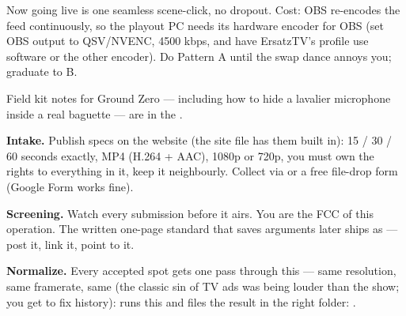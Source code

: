 \documentclass[fontpath=fonts/,logopath=logo/]{riposte-doc}
\begin{document}
Now going live is one seamless scene-click, no dropout. Cost: OBS re-encodes the feed continuously, so the playout PC needs its hardware encoder for OBS (set OBS output to QSV/NVENC, 4500 kbps, and have ErsatzTV's profile use software or the other encoder). Do Pattern A until the swap dance annoys you; graduate to B.

Field kit notes for Ground Zero — including how to hide a lavalier microphone inside a real baguette — are in the .



\begin{ripnumbers}
\item \textbf{Intake.} Publish specs on the website (the site file has them built in): 15 / 30 / 60 seconds exactly, MP4 (H.264 + AAC), 1080p or 720p, you must own the rights to everything in it, keep it neighbourly. Collect via  or a free file-drop form (Google Form works fine).
\item \textbf{Screening.} Watch every submission before it airs. You are the FCC of this operation. The written one-page standard that saves arguments later ships as  — post it, link it, point to it.
\item \textbf{Normalize.} Every accepted spot gets one pass through this — same resolution, same framerate, same  (the classic sin of TV ads was being louder than the show; you get to fix history):  \ripmarker{}   runs this and files the result in the right folder: .

\end{ripnumbers}
\end{document}
